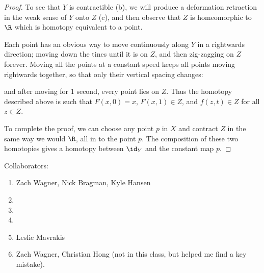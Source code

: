 \documentclass[12pt,letterpaper]{article}
\begin{document}
\begin{enumerate}
\begin{enumerate}[label=(\alph*)]
\begin{proof}
	\pagebreak
	To see that $Y$ is contractible (b), we will produce a deformation retraction in the weak sense of $Y$ onto $Z$ (c), and then observe that $Z$ is homeomorphic to $\R$ which is homotopy equivalent to a point. 
	
	Each point has an obvious way to move continuously along $Y$ in a rightwards direction; moving down the tines until it is on $Z$, and then zig-zagging on $Z$ forever. 
	Moving all the points at a constant speed keeps all points moving rightwards together, so that only their vertical spacing changes: 
	
	
	and after moving for 1 second, every point lies on $Z$. Thus the homotopy described above is such that $F(x,0)=x$, $F(x,1)\in Z$, and $f(z,t)\in Z$ for all $z\in Z$. 
	
	To complete the proof, we can choose any point $p$ in $X$ and contract $Z$ in the same way we would $\R$, all in to the point $p$. The composition of these two homotopies gives a homotopy between $\id_Y$ and the constant map $p$. 
	\end{proof}
	
	\end{enumerate}

\end{enumerate}

\vfill

Collaborators:
\begin{enumerate}
\item Zach Wagner, Nick Bragman, Kyle Hansen

\item

\item

\item

\item Leslie Mavrakis

\item Zach Wagner, Christian Hong (not in this class, but helped me find a key mistake). 
\end{enumerate}
\end{document}
